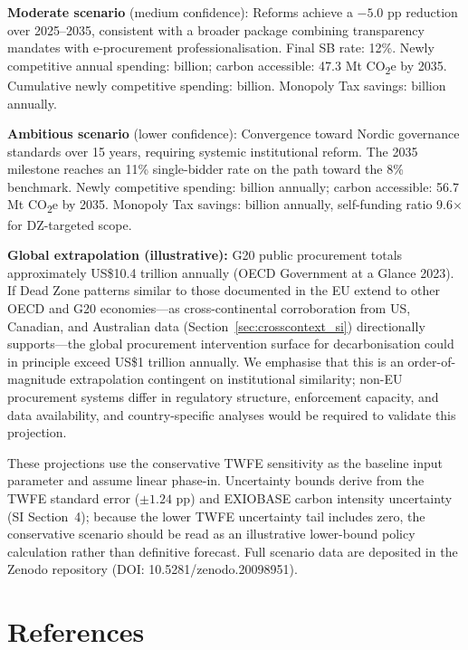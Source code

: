\documentclass[11pt]{article}
\begin{document}
\textbf{Moderate scenario} (medium confidence): Reforms achieve a $-5.0$ pp reduction over 2025--2035, consistent with a broader package combining transparency mandates with e-procurement professionalisation. Final SB rate: 12\%. Newly competitive annual spending:  billion; carbon accessible: 47.3 Mt CO\textsubscript{2}e by 2035. Cumulative newly competitive spending:  billion. Monopoly Tax savings:  billion annually.

\textbf{Ambitious scenario} (lower confidence): Convergence toward Nordic governance standards over 15 years, requiring systemic institutional reform. The 2035 milestone reaches an 11\% single-bidder rate on the path toward the 8\% benchmark. Newly competitive spending:  billion annually; carbon accessible: 56.7 Mt CO\textsubscript{2}e by 2035. Monopoly Tax savings:  billion annually, self-funding ratio 9.6$\times$ for DZ-targeted scope.

\textbf{Global extrapolation (illustrative):} G20 public procurement totals approximately US\$10.4 trillion annually (OECD Government at a Glance 2023). If Dead Zone patterns similar to those documented in the EU extend to other OECD and G20 economies---as cross-continental corroboration from US, Canadian, and Australian data (Section~\ref{sec:crosscontext_si}) directionally supports---the global procurement intervention surface for decarbonisation could in principle exceed US\$1 trillion annually. We emphasise that this is an order-of-magnitude extrapolation contingent on institutional similarity; non-EU procurement systems differ in regulatory structure, enforcement capacity, and data availability, and country-specific analyses would be required to validate this projection.

These projections use the conservative TWFE sensitivity as the baseline input parameter and assume linear phase-in. Uncertainty bounds derive from the TWFE standard error ($\pm 1.24$ pp) and EXIOBASE carbon intensity uncertainty (SI Section~4); because the lower TWFE uncertainty tail includes zero, the conservative scenario should be read as an illustrative lower-bound policy calculation rather than definitive forecast. Full scenario data are deposited in the Zenodo repository (DOI: 10.5281/zenodo.20098951).

\clearpage


\section{References}
\end{document}
